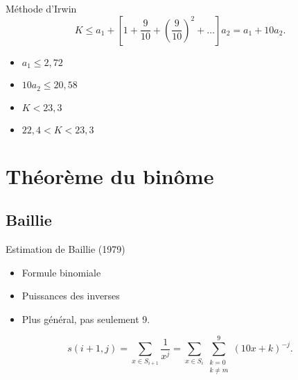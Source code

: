 \documentclass{beamer}
\begin{document}
\begin{frame}{M\'ethode d'Irwin}
	\[
		K \le a_{1} + \left[ 1+\frac{9}{10} +\left(\frac{9}{10}\right)^{2} +
		\dots\right] a_{2} = a_{1} + 10 a_{2}.
	\]
	\begin{itemize}
		\item $a_{1} \le 2,72$
		\item $10a_{2} \le 20,58$
		\item $K < 23,3$
		\item $ 22,4 < K < 23,3$
	\end{itemize}



\end{frame}

\section{Théorème du binôme}

\subsection{Baillie}

\begin{frame}{Estimation de Baillie (1979)}
	\begin{itemize}
		\item Formule binomiale
		\item Puissances des inverses
		\item Plus g\'en\'eral, pas seulement 9.
	\end{itemize}

	\[
		s(i+1,j) = \sum_{x\in S_{i+1}}\frac{1}{x^{j}} = \sum_{x\in S_{i}}
		\sum_{\substack{k=0\\ k\ne m}}^{9} (10x+k)^{-j}.
	\]
\end{frame}
\end{document}
